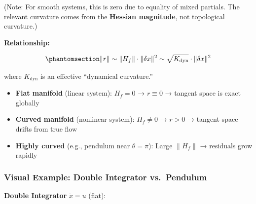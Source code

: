\documentclass[
  letterpaper,
  DIV=11,
  numbers=noendperiod]{scrartcl}
\providecommand{\tightlist}{%
  \setlength{\itemsep}{0pt}\setlength{\parskip}{0pt}}\usepackage{longtable,booktabs,array}
\begin{document}
(Note: For smooth systems, this is zero due to equality of mixed
partials. The relevant curvature comes from the \textbf{Hessian
magnitude}, not topological curvature.)

\textbf{Relationship:}

\begin{equation}\phantomsection\label{eq-curvature-residual}{
\| r \| \sim \|H_f\| \cdot \|\delta x\|^2 \sim \sqrt{K_{\text{dyn}}} \cdot \|\delta x\|^2
}\end{equation}

where \(K_{\text{dyn}}\) is an effective ``dynamical curvature.''

\begin{tcolorbox}[enhanced jigsaw, breakable, bottomtitle=1mm, title=\textcolor{quarto-callout-note-color}{\faInfo}\hspace{0.5em}{Intuition}, opacityback=0, left=2mm, titlerule=0mm, colframe=quarto-callout-note-color-frame, opacitybacktitle=0.6, bottomrule=.15mm, toptitle=1mm, toprule=.15mm, arc=.35mm, leftrule=.75mm, rightrule=.15mm, colback=white, colbacktitle=quarto-callout-note-color!10!white, coltitle=black]

\begin{itemize}
\tightlist
\item
  \textbf{Flat manifold} (linear system): \(H_f = 0\) → \(r \equiv 0\) →
  tangent space is exact globally
\item
  \textbf{Curved manifold} (nonlinear system): \(H_f \neq 0\) →
  \(r > 0\) → tangent space drifts from true flow
\item
  \textbf{Highly curved} (e.g., pendulum near \(\theta = \pi\)): Large
  \(\|H_f\|\) → residuals grow rapidly
\end{itemize}

\end{tcolorbox}

\subsubsection{Visual Example: Double Integrator
vs.~Pendulum}\label{visual-example-double-integrator-vs.-pendulum}

\textbf{Double Integrator} \(\ddot{x} = u\) (flat):
\end{document}
